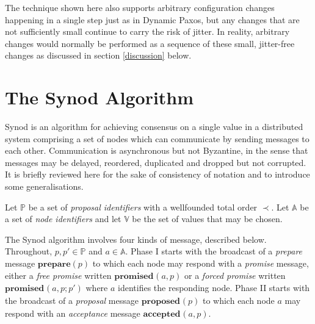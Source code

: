 \documentclass[journal]{IEEEtran}
\begin{document}
The technique shown here also supports arbitrary configuration changes
happening in a single step just as in Dynamic Paxos, but any changes that are
not sufficiently small continue to carry the risk of jitter. In reality,
arbitrary changes would normally be performed as a sequence of these small,
jitter-free changes as discussed in section \ref{discussion} below.

\section{The Synod Algorithm}

Synod\cite{part-time-parliament} is an algorithm for achieving consensus on a
single value in a distributed system comprising a set of nodes which can
communicate by sending messages to each other. Communication is asynchronous
but not Byzantine, in the sense that messages may be delayed, reordered,
duplicated and dropped but not corrupted. It is briefly reviewed here for the
sake of consistency of notation and to introduce some generalisations.

Let $\mathbb P$ be a set of \textit{proposal identifiers} with a wellfounded
total order $\prec$. Let $\mathbb A$ be a set of \textit{node identifiers} and
let $\mathbb V$ be the set of values that may be chosen.

\def\prep#1{\mathbf{prepare}(#1)}
\def\mprom#1#2#3{\mathbf{promised}_{\ge #1}(#2,#3)}
\def\fprom#1#2#3{\mathbf{promised}_{#1}(#2,#3)}
\def\bprom#1#2#3#4{\mathbf{promised}_{#1}(#2,#3;#4)}
\def\prop#1#2{\mathbf{proposed}_{#1}(#2)}
\def\acc#1#2#3{\mathbf{accepted}_{#1}(#2,#3)}
\def\chosen#1#2{\mathbf{chosen}_{#1}(#2)}
\def\owner#1{\mathrm{owner}(#1)}

The Synod algorithm involves four kinds of message, described below.
Throughout, $p, p' \in \mathbb P$ and $a \in \mathbb A$.  Phase I starts with
the broadcast of a \textit{prepare} message $\prep{p}$ to which each node may
respond with a \textit{promise} message, either a \textit{free promise} written
$\fprom{}{a}{p}$ or a \textit{forced promise} written $\bprom{}{a}{p}{p'}$
where $a$ identifies the responding node.  Phase II starts with the broadcast
of a \textit{proposal} message $\prop{}{p}$ to which each node $a$ may respond
with an \textit{acceptance} message $\acc{}{a}{p}$.
\end{document}
